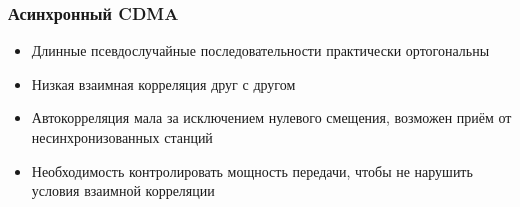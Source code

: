 \documentclass[utf8]{beamer}
\begin{document}
\begin{frame}
\frametitle{Асинхронный CDMA}
\begin{itemize}
 \item Длинные псевдослучайные последовательности практически ортогональны
 \item Низкая взаимная корреляция друг с другом
 \item Автокорреляция мала за исключением нулевого смещения, возможен приём от несинхронизованных станций
 \item Необходимость контролировать мощность передачи, чтобы не нарушить условия взаимной корреляции
\end{itemize}

\end{frame}

\end{document}
